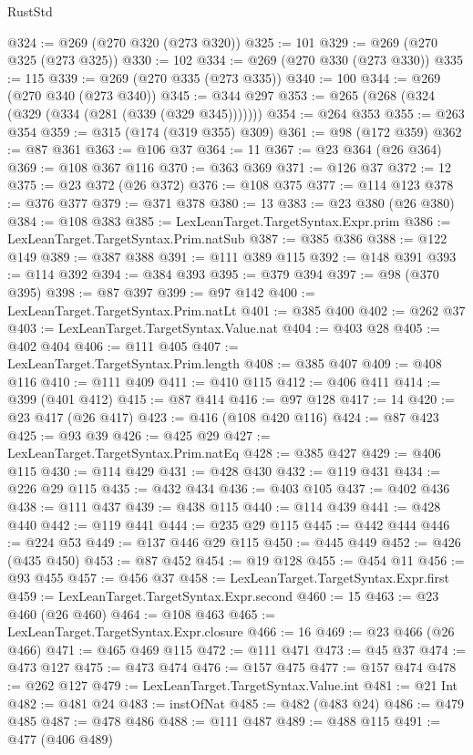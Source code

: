 \begin{lexlean}{RustStd}
\begin{coremodule}
@324 := @269 (@270 @320 (@273 @320))
@325 := 101
@329 := @269 (@270 @325 (@273 @325))
@330 := 102
@334 := @269 (@270 @330 (@273 @330))
@335 := 115
@339 := @269 (@270 @335 (@273 @335))
@340 := 100
@344 := @269 (@270 @340 (@273 @340))
@345 := @344 @297
@353 := @265 (@268 (@324 (@329 (@334 (@281 (@339 (@329 @345)))))))
@354 := @264 @353
@355 := @263 @354
@359 := @315 (@174 (@319 @355) @309)
@361 := @98 (@172 @359)
@362 := @87 @361
@363 := @106 @37
@364 := 11
@367 := @23 @364 (@26 @364)
@369 := @108 @367 @116
@370 := @363 @369
@371 := @126 @37
@372 := 12
@375 := @23 @372 (@26 @372)
@376 := @108 @375
@377 := @114 @123
@378 := @376 @377
@379 := @371 @378
@380 := 13
@383 := @23 @380 (@26 @380)
@384 := @108 @383
@385 := LexLeanTarget.TargetSyntax.Expr.prim
@386 := LexLeanTarget.TargetSyntax.Prim.natSub
@387 := @385 @386
@388 := @122 @149
@389 := @387 @388
@391 := @111 @389 @115
@392 := @148 @391
@393 := @114 @392
@394 := @384 @393
@395 := @379 @394
@397 := @98 (@370 @395)
@398 := @87 @397
@399 := @97 @142
@400 := LexLeanTarget.TargetSyntax.Prim.natLt
@401 := @385 @400
@402 := @262 @37
@403 := LexLeanTarget.TargetSyntax.Value.nat
@404 := @403 @28
@405 := @402 @404
@406 := @111 @405
@407 := LexLeanTarget.TargetSyntax.Prim.length
@408 := @385 @407
@409 := @408 @116
@410 := @111 @409
@411 := @410 @115
@412 := @406 @411
@414 := @399 (@401 @412)
@415 := @87 @414
@416 := @97 @128
@417 := 14
@420 := @23 @417 (@26 @417)
@423 := @416 (@108 @420 @116)
@424 := @87 @423
@425 := @93 @39
@426 := @425 @29
@427 := LexLeanTarget.TargetSyntax.Prim.natEq
@428 := @385 @427
@429 := @406 @115
@430 := @114 @429
@431 := @428 @430
@432 := @119 @431
@434 := @226 @29 @115
@435 := @432 @434
@436 := @403 @105
@437 := @402 @436
@438 := @111 @437
@439 := @438 @115
@440 := @114 @439
@441 := @428 @440
@442 := @119 @441
@444 := @235 @29 @115
@445 := @442 @444
@446 := @224 @53
@449 := @137 @446 @29 @115
@450 := @445 @449
@452 := @426 (@435 @450)
@453 := @87 @452
@454 := @19 @128
@455 := @454 @11
@456 := @93 @455
@457 := @456 @37
@458 := LexLeanTarget.TargetSyntax.Expr.first
@459 := LexLeanTarget.TargetSyntax.Expr.second
@460 := 15
@463 := @23 @460 (@26 @460)
@464 := @108 @463
@465 := LexLeanTarget.TargetSyntax.Expr.closure
@466 := 16
@469 := @23 @466 (@26 @466)
@471 := @465 @469 @115
@472 := @111 @471
@473 := @45 @37
@474 := @473 @127
@475 := @473 @474
@476 := @157 @475
@477 := @157 @474
@478 := @262 @127
@479 := LexLeanTarget.TargetSyntax.Value.int
@481 := @21 Int
@482 := @481 @24
@483 := instOfNat
@485 := @482 (@483 @24)
@486 := @479 @485
@487 := @478 @486
@488 := @111 @487
@489 := @488 @115
@491 := @477 (@406 @489)

\end{coremodule}
\end{lexlean}
